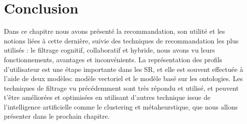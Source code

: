\documentclass[a4paper,12pt,letterpaper,headsepline,singlespacing,headsepline, french]{report}
\begin{document}
\section {Conclusion}
Dans ce chapitre nous avons présenté la recommandation, son utilité et les notions liées à cette dernière, suivie des techniques de recommandation les plus utilisés : le filtrage cognitif, collaboratif et hybride, nous avons vu leurs fonctionnements, avantages et inconvénients. 
La représentation des profils d’utilisateur est une étape importante dans les SR, et elle est souvent effectuée à l’aide de deux modèles:  modèle vectoriel et le modèle basé sur les ontologies.
Les techniques de filtrage vu précédemment sont très répondu et utilisé, et peuvent t’être améliorées et optimisées en utilisant d’autres technique issue de l’intelligence artificielle comme le clustering et métaheurstique, que nous allons présenter dans le prochain chapitre. 


\newpage

\newpage

\newpage

\newpage
\end{document}
